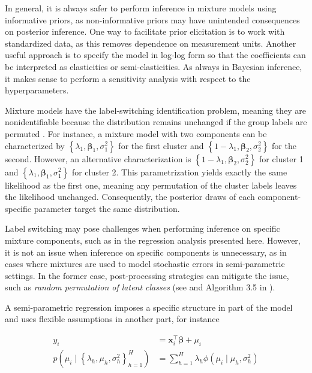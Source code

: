 In general, it is always safer to perform inference in mixture models using informative priors, as non-informative priors may have unintended consequences on posterior inference. One way to facilitate prior elicitation is to work with standardized data, as this removes dependence on measurement units. Another useful approach is to specify the model in log-log form so that the coefficients can be interpreted as elasticities or semi-elasticities. As always in Bayesian inference, it makes sense to perform a sensitivity analysis with respect to the hyperparameters.

Mixture models have the label-switching identification problem, meaning they are nonidentifiable because the distribution remains unchanged if the group labels are permuted \cite{van2011bayesian}. For instance, a mixture model with two components can be characterized by $\left\{\lambda_1,\boldsymbol{\beta}_1,\sigma_1^2\right\}$ for the first cluster and $\left\{1-\lambda_1,\boldsymbol{\beta}_2,\sigma_2^2\right\}$ for the second. However, an alternative characterization is $\left\{1-\lambda_1,\boldsymbol{\beta}_2,\sigma_2^2\right\}$ for cluster 1 and $\left\{\lambda_1,\boldsymbol{\beta}_1,\sigma_1^2\right\}$ for cluster 2. This parametrization yields exactly the same likelihood as the first one, meaning any permutation of the cluster labels leaves the likelihood unchanged. Consequently, the posterior draws of each component-specific parameter target the same distribution.

Label switching may pose challenges when performing inference on specific mixture components, such as in the regression analysis presented here. However, it is not an issue when inference on specific components is unnecessary, as in cases where mixtures are used to model stochastic errors in semi-parametric settings. In the former case, post-processing strategies can mitigate the issue, such as \textit{random permutation of latent classes} (see \cite[p.~534]{gelman2021bayesian} and Algorithm 3.5 in \cite[p.~82]{fruhwirth2006finite}). 

A semi-parametric regression imposes a specific structure in part of the model and uses flexible assumptions in another part, for instance

\begin{align*}
	y_i&=\boldsymbol{x}_i^{\top}\boldsymbol{\beta}+\mu_i\\
	p(\mu_i \mid \left\{\lambda_h,\mu_h,\sigma_h^2\right\}_{h=1}^H)&=\sum_{h=1}^H\lambda_h\phi(\mu_i\mid \mu_h,\sigma_h^2) 
\end{align*}

